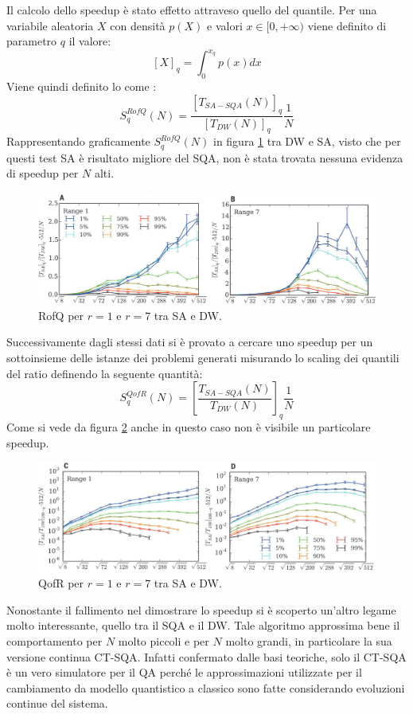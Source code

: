 Il calcolo dello speedup è stato effetto attraveso quello del quantile. Per una variabile aleatoria $X$ con densità $p(X)$ e valori $x \in [0, +\infty)$ viene definito  di parametro $q$ il valore:
$$[X]_q = \int_0^{x_q} p(x) dx$$
Viene quindi definito lo  come :
$$S_{q}^{RofQ}(N) = \frac{[T_{SA-SQA}(N)]_q}{[T_{DW}(N)]_q}\frac{1}{N}$$
Rappresentando graficamente $S_{q}^{RofQ}(N)$ in figura \ref{figura:RofQ} tra DW e SA, visto che per questi test SA è risultato migliore del SQA, non è stata trovata nessuna evidenza di speedup per $N$ alti.

\begin{figure}[htbp]
  \centering
  \includegraphics[scale=0.3]{Immagini/RofQ.jpg}
  \caption{RofQ per $r=1$ e $r=7$ tra SA e DW.}
  \label{figura:RofQ}
\end{figure}

Successivamente dagli stessi dati si è provato a cercare uno speedup per un sottoinsieme delle istanze dei problemi generati misurando lo scaling dei quantili del ratio definendo la seguente quantità:
$$S_{q}^{QofR}(N) = \left[\frac{T_{SA-SQA}(N)}{T_{DW}(N)}\right]_q \frac{1}{N}$$
Come si vede da figura \ref{figura:QofR} anche in questo caso non è visibile un particolare speedup.
\begin{figure}[htbp]
  \centering
  \includegraphics[scale=0.3]{Immagini/QofR.jpg}
  \caption{QofR per $r=1$ e $r=7$ tra SA e DW.}
  \label{figura:QofR}
\end{figure}


Nonostante il fallimento nel dimostrare lo speedup si è scoperto un'altro legame molto interessante, quello tra il SQA e il DW. Tale algoritmo approssima bene il comportamento per $N$ molto piccoli e per $N$ molto grandi\cite{EQA}, in particolare la sua versione continua CT-SQA\cite{QVC}. Infatti confermato dalle basi teoriche, solo il CT-SQA è un vero simulatore per il QA perché le approssimazioni utilizzate per il cambiamento da modello quantistico a classico sono fatte considerando evoluzioni continue del sistema.

